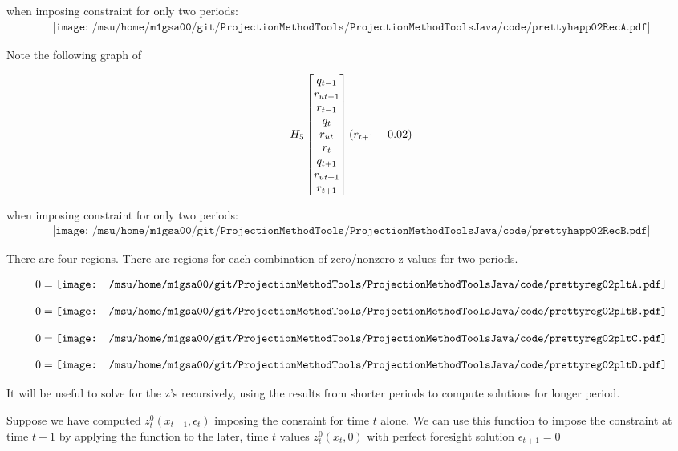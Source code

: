   when imposing constraint for only two periods:
 \begin{gather*}
 \texttt{[image: /msu/home/m1gsa00/git/ProjectionMethodTools/ProjectionMethodToolsJava/code/prettyhapp02RecA.pdf]}
 \end{gather*}


 Note the following graph of 

 \begin{gather*}
 H_{5}\begin{bmatrix} q_{t-1}\\r_{ut-1}\\r_{t-1}\\ q_{t}\\r_{ut}\\r_{t}\\ q_{t+1}\\r_{ut+1}\\r_{t+1} \end{bmatrix}( r_{t+1}-0.02)
 \end{gather*}

  when imposing constraint for only two periods:
 \begin{gather*}
 \texttt{[image: /msu/home/m1gsa00/git/ProjectionMethodTools/ProjectionMethodToolsJava/code/prettyhapp02RecB.pdf]}
 \end{gather*}




There are four regions.  There are regions for each combination of zero/nonzero z values for two periods.



\begin{gather*}
  0=\vcenter{\hbox{\texttt{[image: /msu/home/m1gsa00/git/ProjectionMethodTools/ProjectionMethodToolsJava/code/prettyreg02pltA.pdf]}}}
\end{gather*}


\begin{gather*}
  0=\vcenter{\hbox{\texttt{[image: /msu/home/m1gsa00/git/ProjectionMethodTools/ProjectionMethodToolsJava/code/prettyreg02pltB.pdf]}}}
\end{gather*}


\begin{gather*}
  0=\vcenter{\hbox{\texttt{[image: /msu/home/m1gsa00/git/ProjectionMethodTools/ProjectionMethodToolsJava/code/prettyreg02pltC.pdf]}}}
\end{gather*}


\begin{gather*}
  0=\vcenter{\hbox{\texttt{[image: /msu/home/m1gsa00/git/ProjectionMethodTools/ProjectionMethodToolsJava/code/prettyreg02pltD.pdf]}}}
\end{gather*}




It will be useful to solve for the z's recursively, using the results from shorter periods to compute solutions for longer period.

Suppose we have computed $z^0_t(x_{t-1},\epsilon_t)$ imposing the consraint for time $t$ alone.  We can use this function to impose the constraint at time $t+1$ by applying the function to the later, time $t$ values   $z^0_t(x_{t},0)$ with perfect foresight solution $\epsilon_{t+1}=0$


